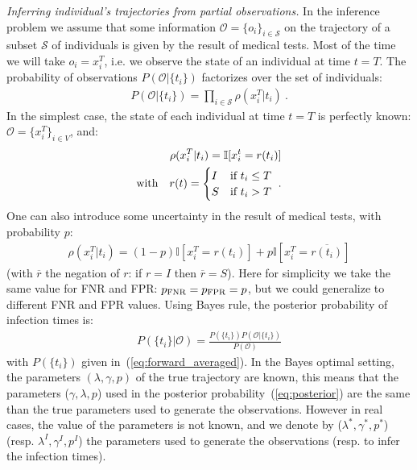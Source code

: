 \documentclass[a4paper, amsfonts, amssymb, amsmath, reprint, showkeys, nofootinbib, twoside, floatfix, pre,superscriptaddress]{revtex4-2}
\begin{document}
{\it Inferring individual's trajectories from partial observations.}
In the inference problem we assume that some information $\mathcal{O}=\{o_i\}_{i\in\mathcal{S}}$ on the trajectory of a subset $\mathcal{S}$ of individuals is given by the result of medical tests. 
Most of the time we will take $o_i=x_i^T$, i.e. we observe the state of an individual at time $t=T$.
The probability of observations $P(\mathcal{O}|\{t_i\})$ factorizes over the set of individuals:
\begin{align}
\label{eq:observations}
P(\mathcal{O}|\{t_i\})=\prod_{i\in\mathcal{S}}\rho(x_i^T|t_i) \ .
\end{align}
In the simplest case, the state of each individual at time $t=T$ is perfectly known: $\mathcal{O}=\{x_i^T\}_{i\in V}$, and:
\begin{align*}
	\rho(x_i^T|t_i)=\mathbb{I}[x_i^t=r(t_i) ] \\
	{\rm with} \quad r(t)=\begin{cases}
		I & \text{if $t_i\leq T$}\\
		S & \text{if $t_i>T$}
\end{cases} \ .	
\end{align*}
One can also introduce some uncertainty in the result of medical tests, with probability $p$:
\begin{align}
	\label{eq:prob_falserate}
	\rho(x_i^T|t_i)=(1-p)\mathbb{I}[x_i^T= r(t_i)] + p\mathbb{I}[x_i^T= \overline{r(t_i)}] 
\end{align}
(with $\overline{r}$ the negation of $r$: if $r=I$ then $\overline{r}=S$). Here for simplicity we take the same value for FNR and FPR: $p_{\rm FNR}=p_{\rm FPR}=p$, but we could generalize to different FNR and FPR values.
Using Bayes rule, the posterior probability of infection times is:
\begin{align}
\label{eq:posterior}
P(\{t_i\}|\mathcal{O}) = \frac{P(\{t_i\})P(\mathcal{O}|\{t_i\})}{P(\mathcal{O})}
\end{align}
with $P(\{t_i\})$ given in~(\ref{eq:forward_averaged}).
In the Bayes optimal setting, the parameters $(\lambda,\gamma, p)$ of the true trajectory are known, this means that the parameters ($\gamma, \lambda, p$) used in the posterior probability~(\ref{eq:posterior}) are the same than the true parameters used to generate the observations.
However in real cases, the value of the parameters is not known, and we denote by ($\lambda^*, \gamma^*, p^*$) (resp. $\lambda^I, \gamma^I, p^I$) the parameters used to generate the observations (resp. to infer the infection times).
\end{document}

